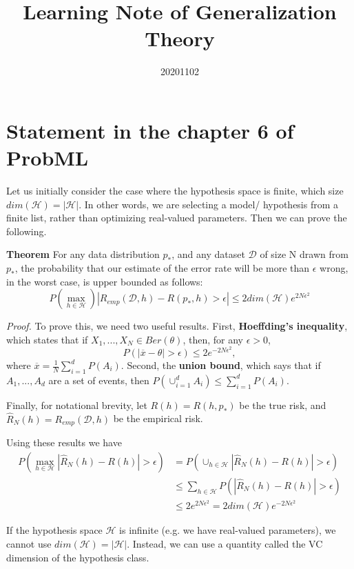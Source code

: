 \documentclass{article}
\title{Learning Note of Generalization Theory}
\date{20201102}
\begin{document}
\maketitle

\section{Statement in the chapter 6 of ProbML}
Let us initially consider the case where the hypothesis space is finite, which size $dim(\mathcal H) = |\mathcal H|$. In other words, we are selecting a model/ hypothesis from a finite list, rather than optimizing real-valued parameters. Then we can prove the following.

\textbf{Theorem} For any data distribution $p_*$, and any dataset $\mathcal D$ of size N drawn from $p_*$, the probability that our estimate of the error rate will be more than $\epsilon$ wrong, in the worst case, is upper bounded as follows:
$$P(\max_{h\in\mathcal H})|R_{emp}(\mathcal D, h) - R(p_*, h) > \epsilon| \leq 2 dim(\mathcal H) e^{2N\epsilon^2}$$

\textit{Proof.} To prove this, we need two useful results. First, \textbf{Hoeffding's inequality}, which states that if $X_1, ..., X_N \in Ber(\theta)$, then, for any $\epsilon > 0$,
$$P(|\overline{x} - \theta| > \epsilon) \leq 2 e^{-2N\epsilon^2},$$
where $\overline{x} = \frac{1}{N} \sum_{i=1}^d P(A_i)$. Second, the \textbf{union bound}, which says that if $A_1, ..., A_d$ are a set of events, then $P(\cup_{i=1}^d A_i) \leq \sum_{i=1}^d P(A_i)$.

Finally, for notational brevity, let $R(h) = R(h, p_*)$ be the true risk, and $\hat{R}_N(h) = R_{emp}(\mathcal D, h)$ be the empirical risk.

Using these results we have
\begin{equation}
\begin{split}
P(\max_{h \in \mathcal{H}} |\hat{R}_N(h) - R(h)| > \epsilon) & = 
P(\cup_{h \in \mathcal{H}} |\hat{R}_N(h) - R(h)| > \epsilon) \\
& \leq \sum_{h \in \mathcal{H}} P(|\hat{R}_N(h) - R(h)| > \epsilon) \\
& \leq 2 e^{2N\epsilon^2} = 2 dim(\mathcal H)e^{-2N\epsilon^2}
\end{split}
\end{equation}

If the hypothesis space $\mathcal H$ is infinite (e.g. we have real-valued parameters), we cannot use $dim(\mathcal H) = |\mathcal H|$. Instead, we can use a quantity called the VC dimension of the hypothesis class.
\end{document}

